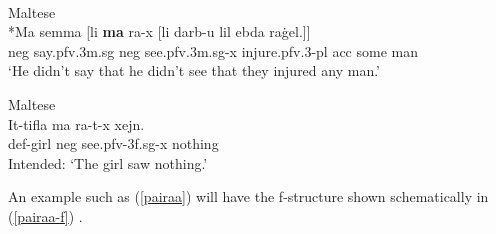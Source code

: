 \documentclass[output=paper,hidelinks]{langscibook}
\begin{document}
\ea\label{ma2}
 {  } \hfill{\citep[159]{camilleri-sadler:2017} }
\z



\ea\label{x-rep2}
 \\
\citep[159]{camilleri-sadler:2017}
\z








\ea\label{ent3}
 { }
\hfill{\citep[159]{camilleri-sadler:2017} }
\z




\ea\label{2negs-rev} Maltese \citep[159]{camilleri-sadler:2017} \\
\gll
*Ma semma [li {\bf{ma}} ra-x [li darb-u lil ebda ra{\.g}el.]]\\
{\sc neg} say.{\sc pfv.3m.sg} \phantom{[}{\sc comp} {\sc neg} see.{\sc pfv.3m.sg-x} \phantom{[}{\sc comp} injure.{\sc pfv.3-pl} {\sc acc} some man\\
\glt `He didn't say that he didn't see that they injured any man.'
\z


\ea\label{less-simple}  Maltese \citep[159]{camilleri-sadler:2017} \\
\gll *It-tifla ma ra-t-x  xejn.\\
{\sc def-}girl {\sc neg} see.{\sc pfv-3f.sg-{\sc x}} nothing\\
\glt Intended: `The girl saw nothing.'
\z



An example such as (\ref{pairaa}) will have the f-structure shown
schematically in (\ref{pairaa-f}) \citep[161]{camilleri-sadler:2017}.
\end{document}
